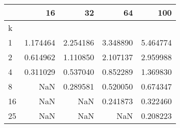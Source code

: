 \begin{tabular}{lrrrr}
\toprule
{} &       16  &       32  &       64  &       100 \\
\midrule
k  &           &           &           &           \\
1  &  1.174464 &  2.254186 &  3.348890 &  5.464774 \\
2  &  0.614962 &  1.110850 &  2.107137 &  2.959988 \\
4  &  0.311029 &  0.537040 &  0.852289 &  1.369830 \\
8  &       NaN &  0.289581 &  0.520050 &  0.674347 \\
16 &       NaN &       NaN &  0.241873 &  0.322460 \\
25 &       NaN &       NaN &       NaN &  0.208223 \\
\bottomrule
\end{tabular}

